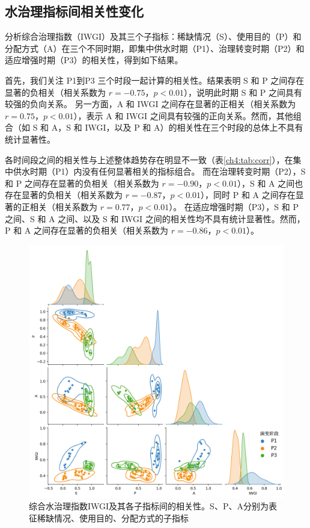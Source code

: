 
\subsection{水治理指标间相关性变化}

分析综合治理指数（IWGI）及其三个子指标：稀缺情况（S）、使用目的（P）和分配方式（A）在三个不同时期，即集中供水时期（P1）、治理转变时期（P2）和适应增强时期（P3）的相关性，得到如下结果。

首先，我们关注 P1到P3 三个时段一起计算的相关性。结果表明 S 和 P 之间存在显著的负相关（相关系数为 $r = -0.75$，$p < 0.01$），说明此时期 S 和 P 之间具有较强的负向关系。
另一方面，A 和 IWGI 之间存在显著的正相关（相关系数为 $r = 0.75$，$p < 0.01$），表示 A 和 IWGI 之间具有较强的正向关系。然而，其他组合（如 S 和 A，S 和 IWGI，以及 P 和 A）的相关性在三个时段的总体上不具有统计显著性。

各时间段之间的相关性与上述整体趋势存在明显不一致（表\ref{ch4:tab:corr}），在集中供水时期（P1）内没有任何显著相关的指标组合。
而在治理转变时期（P2），S 和 P 之间存在显著的负相关（相关系数为 $r = -0.90$，$p < 0.01$），S 和 A 之间也存在显著的负相关（相关系数为 $r = -0.87$，$p < 0.01$），同时 P 和 A 之间存在显著的正相关（相关系数为 $r = 0.77$，$p < 0.01$）。
在适应增强时期（P3），S 和 P 之间、S 和 A 之间、以及 S 和 IWGI 之间的相关性均不具有统计显著性。然而，P 和 A 之间存在显著的负相关（相关系数为 $r = -0.86$，$p < 0.01$）。

\begin{figure}[!ht]
    \centering
    \includegraphics[width=\textwidth]{img/ch4/ch4_correlation.png}
    \caption[综合水治理指数IWGI及其各子指标间的相关性]{综合水治理指数IWGI及其各子指标间的相关性。S、P、A分别为表征稀缺情况、使用目的、分配方式的子指标}\label{ch4:fig:corr}
\end{figure}

